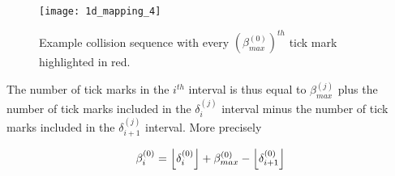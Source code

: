 \begin{figure}[H]
  \begin{center}
    \texttt{[image: 1d\_mapping\_4]}
  \end{center}
  \vspace{-.2in} %
  \caption{\label{fig:a-sequence} Example collision sequence with every $(\beta^{(0)}_{max})^{th}$ tick mark highlighted in red.}
\end{figure}

The number of tick marks in the $i^{th}$ interval is thus equal to $\beta^{(j)}_{max}$ plus the number of tick marks included in the $\delta^{(j)}_i$ interval minus the number of tick marks included in the $\delta^{(j)}_{i+1}$ interval. More precisely

\begin{align}\label{eq:beta_i}
  \beta^{(0)}_i = \floor{\delta^{(0)}_i} + \beta^{(0)}_{max} - \floor{\delta^{(0)}_{i+1}}
\end{align}